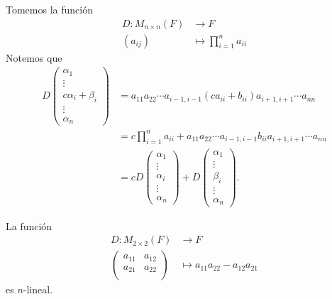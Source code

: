 \documentclass[12pt,a4paper]{book}
\begin{document}
    \begin{ejemplo}
    \label{ej:41}
        Tomemos la función
        \begin{align*}
            D: M_{n \times n}(F) & \longrightarrow F\\
            (a_{ij}) & \longmapsto \prod_{i = 1}^{n}a_{ii}
        \end{align*}
        Notemos que 
        \begin{align*}
            D\begin{pmatrix}
                \alpha_{1}\\
                \vdots\\
                c \alpha_{i} + \beta_{i}\\
                \vdots\\
                \alpha_{n}
            \end{pmatrix} & =
            a_{11}a_{22} \dotsi a_{i-1,i-1}(ca_{ii} + b_{ii})a_{i + 1, i + 1}\dotsi a_{nn}\\
            & = c \prod_{i = 1}^{n}a_{ii} + a_{11}a_{22} \dotsi a_{i-1,i-1}b_{ii}a_{i + 1, i + 1}\dotsi a_{nn}\\
            & = cD
            \begin{pmatrix}
                \alpha_{1}\\
                \vdots\\
                \alpha_{i}\\
                \vdots\\
                \alpha_{n}
            \end{pmatrix} + D
            \begin{pmatrix}
                \alpha_{1}\\
                \vdots\\
                \beta_{i}\\
                \vdots\\
                \alpha_{n}
            \end{pmatrix}.
        \end{align*}
    \end{ejemplo}

    \begin{proposicion}
    \label{prop:37}
        La función
        \begin{align*}
            D: M_{2 \times 2}(F) & \longrightarrow F\\
            \begin{pmatrix}
                a_{11} & a_{12}\\
                a_{21} & a_{22}\\
            \end{pmatrix} & \longmapsto a_{11}a_{22} - a_{12}a_{21}
        \end{align*}
        es $n$-lineal.
    \end{proposicion}
    
\end{document}
